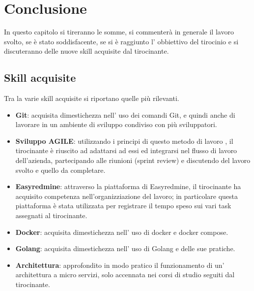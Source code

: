 \documentclass[a4paper,12pt,titlepage,italian,openany]{report}
\begin{document}
\chapter{Conclusione}
In questo capitolo si tireranno le somme, si commenterà in generale il lavoro svolto, se è stato soddisfacente, se si è raggiunto l' obbiettivo del tirocinio e si discuteranno delle nuove skill acquisite dal tirocinante.
\section{Skill acquisite}
Tra la varie skill acquisite si riportano quelle più rilevanti.
\begin{itemize}
    \item[] \textbf{Git}: acquisita dimestichezza nell' uso dei comandi Git, e quindi anche di lavorare in un ambiente di sviluppo condiviso con più sviluppatori.
    \item[] \textbf{Sviluppo AGILE}: utilizzando i principi di questo metodo di lavoro , il tirocinante è riuscito ad adattarsi ad essi ed integrarsi nel flusso di lavoro dell'azienda, partecipando alle riunioni (sprint review) e discutendo del lavoro svolto e quello da completare.
    \item[] \textbf{Easyredmine}: attraverso la piattaforma di Easyredmine\cite{easyredmine:1}, il tirocinante ha acquisito competenza nell'organizziazione del lavoro; in particolare questa piattaforma è stata utilizzata per registrare il tempo speso sui vari task assegnati al tirocinante.
    \item[] \textbf{Docker}: acquisita dimestichezza nell' uso di docker e docker compose.
    \item[] \textbf{Golang}: acquisita dimestichezza nell' uso di Golang e delle sue pratiche.
    \item[] \textbf{Architettura}: approfondito in modo pratico il funzionamento di un' architettura a micro servizi, solo accennata nei corsi di studio seguiti dal tirocinante.
    
\end{itemize}
\end{document}
